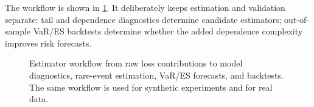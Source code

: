 The workflow is shown in \cref{fig:estimator-workflow}. It deliberately keeps
estimation and validation separate: tail and dependence diagnostics determine
candidate estimators; out-of-sample VaR/ES backtests determine whether the
added dependence complexity improves risk forecasts.

\begin{figure}[p]
\centering

\caption[Estimator workflow]{Estimator workflow from raw loss contributions to
model diagnostics, rare-event estimation, VaR/ES forecasts, and backtests. The
same workflow is used for synthetic experiments and for real data.}
\label{fig:estimator-workflow}
\end{figure}
